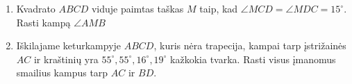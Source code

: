 \begin{enumerate}
\item Kvadrato $ABCD$ viduje paimtas taškas $M$ taip, kad
  $\angle MCD=\angle MDC=15^\circ$. Rasti kampą $\angle AMB$
\item Iškilajame keturkampyje $ABCD$, kuris nėra trapecija,
  kampai tarp įstrižainės $AC$ ir kraštinių yra $55^\circ,
  55^\circ, 16^\circ, 19^\circ$ kažkokia tvarka.  Rasti
  visus įmanomus smailius kampus tarp $AC$ ir $BD$. 

\end{enumerate}
